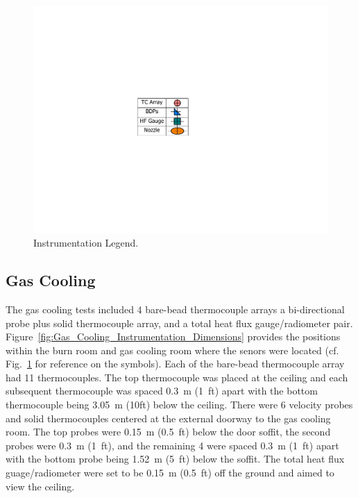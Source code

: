 \documentclass[12pt,oneside]{book}
\begin{document}
\begin{figure}[!ht]
	\includegraphics[width=.35\columnwidth]{../Figures/Floor_Plans/PDFs/DelCo_2012_Instrumentation_Legend.pdf}
	\caption{Instrumentation Legend.}
	\label{fig:Instrumentation_Legend}
\end{figure}

\subsection{Gas Cooling}
\label{subsec:Gas_Cooling_Instrumentation}

The gas cooling tests included 4 bare-bead thermocouple arrays  a bi-directional probe plus solid thermocouple array, and a total heat flux gauge/radiometer pair. Figure~\ref{fig:Gas_Cooling_Instrumentation_Dimensions} provides the positions within the burn room and gas cooling room where the senors were located (cf. Fig.~\ref{fig:Instrumentation_Legend} for reference on the symbols). Each of the bare-bead thermocouple array had 11 thermocouples. The top thermocouple was placed at the ceiling and each subsequent thermocouple was spaced 0.3~m (1~ft) apart with the bottom thermocouple being 3.05~m (10ft) below the ceiling. There were 6 velocity probes and solid thermocouples centered at the external doorway to the gas cooling room. The top probes were 0.15~m (0.5~ft) below the door soffit, the second probes were 0.3~m (1~ft), and the remaining 4 were spaced 0.3~m (1~ft) apart with the bottom probe being 1.52~m (5~ft) below the soffit. The total heat flux guage/radiometer were set to be 0.15~m (0.5~ft) off the ground and aimed to view the ceiling.
\end{document}
